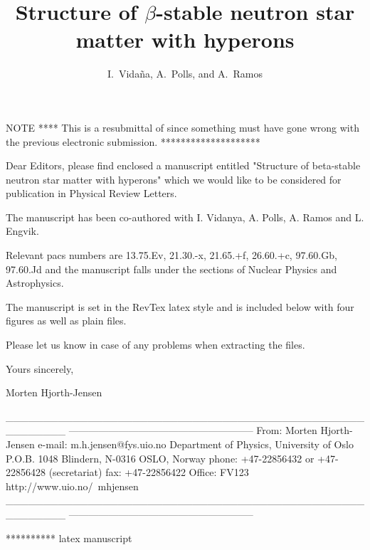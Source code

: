 NOTE ****  This is a resubmittal of 
since something must have gone wrong with the previous electronic
submission.
********************



Dear Editors,
please find enclosed a manuscript entitled 
"Structure of beta-stable neutron star matter with hyperons"
which we would like to be considered for publication 
in Physical Review Letters.

The manuscript has been co-authored with 
I. Vidanya, A. Polls, A. Ramos and L. Engvik.

Relevant pacs numbers are  
13.75.Ev, 21.30.-x, 21.65.+f, 26.60.+c, 97.60.Gb, 97.60.Jd
and the manuscript falls under the sections of Nuclear Physics
and Astrophysics.

The manuscript is set in the RevTex latex style and is included
below with four figures as well as plain files.


Please let us know in case of any problems when extracting the files.


Yours sincerely,

Morten Hjorth-Jensen

________________________________________________________
--------------------------------------------------------
 From: Morten Hjorth-Jensen
       e-mail: m.h.jensen@fys.uio.no
       Department of Physics, University of Oslo
       P.O.B. 1048 Blindern, N-0316 OSLO, Norway
       phone: +47-22856432 or +47-22856428 (secretariat)
       fax:   +47-22856422
       Office: FV123
       http://www.uio.no/~mhjensen
________________________________________________________
--------------------------------------------------------







**********  latex manuscript






\draft



\title{Structure of $\beta$-stable neutron star 
       matter with hyperons}

\author{I.\ Vida\~na, A.\ Polls, and A.\ Ramos}

\address{Departament d'Estructura i Constituents de la Mat\`eria,
Universitat de Barcelona, E-08028 Barcelona, Spain}

